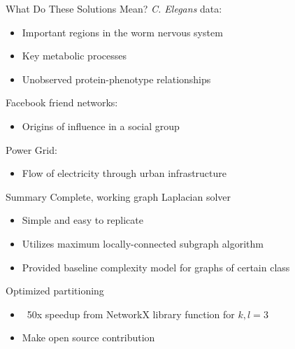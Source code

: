 \documentclass[xcolor=dvipsnames,10pt]{beamer}
\begin{document}
\begin{frame}{What Do These Solutions Mean?}
\large
\textit{C. Elegans} data:
\normalsize
\begin{itemize}
\item Important regions in the worm nervous system
\item Key metabolic processes
\item Unobserved protein-phenotype relationships
\end{itemize}
\vspace{.15in}
\large
Facebook friend networks:
\normalsize
\begin{itemize}
\item Origins of influence in a social group
\end{itemize}
\vspace{.15in}
\large
Power Grid:
\normalsize
\begin{itemize}
\item Flow of electricity through urban infrastructure
\end{itemize}
\end{frame}

\begin{frame}{Summary}
\large
Complete, working graph Laplacian solver
\normalsize
\vspace{.2in}
\begin{itemize}
\item 

Simple and easy to replicate

\item
Utilizes maximum locally-connected subgraph algorithm
\item
Provided baseline complexity model for graphs of certain class

\medskip
\end{itemize}
\vspace{.3in}
\large
Optimized partitioning
\normalsize
\vspace{.2in}
\medskip
\begin{itemize}

\item ~50x speedup from NetworkX library function for $k,l = 3$
\item Make open source contribution

\end{itemize}
 

\end{frame}
\end{document}
